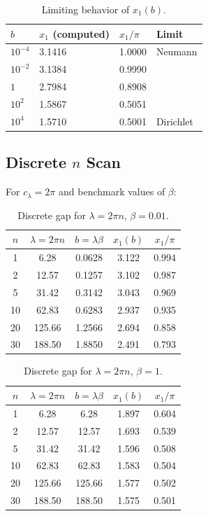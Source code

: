 \documentclass[11pt,a4paper]{article}
\theoremstyle{definition}
\theoremstyle{plain}
\theoremstyle{remark}
\begin{document}
\begin{table}[htbp]
\centering
\caption{Limiting behavior of $x_1(b)$.}
\label{tab:limits}
\begin{tabular}{@{}llll@{}}
\toprule
$b$ & $x_1$ (computed) & $x_1/\pi$ & Limit \\
\midrule
$10^{-4}$ & 3.1416 & 1.0000 & Neumann \\
$10^{-2}$ & 3.1384 & 0.9990 & \\
$1$ & 2.7984 & 0.8908 & \\
$10^{2}$ & 1.5867 & 0.5051 & \\
$10^{4}$ & 1.5710 & 0.5001 & Dirichlet \\
\bottomrule
\end{tabular}
\end{table}

\subsection{Discrete $n$ Scan}

For $c_\lambda = 2\pi$ and benchmark values of $\beta$:

\begin{table}[htbp]
\centering
\caption{Discrete gap for $\lambda = 2\pi n$, $\beta = 0.01$.}
\label{tab:n-scan-001}
\begin{tabular}{@{}ccccc@{}}
\toprule
$n$ & $\lambda = 2\pi n$ & $b = \lambda\beta$ & $x_1(b)$ & $x_1/\pi$ \\
\midrule
1 & 6.28 & 0.0628 & 3.122 & 0.994 \\
2 & 12.57 & 0.1257 & 3.102 & 0.987 \\
5 & 31.42 & 0.3142 & 3.043 & 0.969 \\
10 & 62.83 & 0.6283 & 2.937 & 0.935 \\
20 & 125.66 & 1.2566 & 2.694 & 0.858 \\
30 & 188.50 & 1.8850 & 2.491 & 0.793 \\
\bottomrule
\end{tabular}
\end{table}

\begin{table}[htbp]
\centering
\caption{Discrete gap for $\lambda = 2\pi n$, $\beta = 1$.}
\label{tab:n-scan-1}
\begin{tabular}{@{}ccccc@{}}
\toprule
$n$ & $\lambda = 2\pi n$ & $b = \lambda\beta$ & $x_1(b)$ & $x_1/\pi$ \\
\midrule
1 & 6.28 & 6.28 & 1.897 & 0.604 \\
2 & 12.57 & 12.57 & 1.693 & 0.539 \\
5 & 31.42 & 31.42 & 1.596 & 0.508 \\
10 & 62.83 & 62.83 & 1.583 & 0.504 \\
20 & 125.66 & 125.66 & 1.577 & 0.502 \\
30 & 188.50 & 188.50 & 1.575 & 0.501 \\
\bottomrule
\end{tabular}
\end{table}
\end{document}
